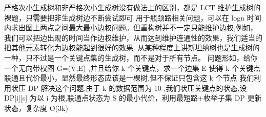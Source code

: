 {}\markdownRendererSectionBegin
{}\markdownRendererInterblockSeparator
{}严格次小生成树和非严格次小生成树没有做法上的区别，都是\markdownRendererDollarSign{} LCT\markdownRendererSoftLineBreak
{}\markdownRendererDollarSign{}维护生成树的裸题，只需要把非生成树边不断尝试即可\markdownRendererInterblockSeparator
{}
\markdownRendererSectionEnd 
\markdownRendererSectionEnd \markdownRendererSectionBegin
{}\markdownRendererInterblockSeparator
{}用于瓶颈路相关问题，可以在\markdownRendererDollarSign{} logn \markdownRendererDollarSign{}时间内求出图上两点之间最大最小边权问题。但重构树并不一定只能维护边权,例如，我们可以把边出现的时间当作边权维护，从而达到维护连通性的效果，我们适当的把其他元素转化为边权能起到很好的效果.\markdownRendererInterblockSeparator
{}\markdownRendererInterblockSeparator
{}
\markdownRendererSectionEnd \markdownRendererSectionBegin
{}\markdownRendererInterblockSeparator
{}从某种程度上讲斯坦纳树也是生成树的一种，只不过是一个关键点集的生成树，而不是对于所有节点。\markdownRendererParagraphSeparator
{}问题形如，给你一个无向带权图\markdownRendererDollarSign{} G=(V,E) \markdownRendererDollarSign{},并且给你\markdownRendererDollarSign{} k\markdownRendererSoftLineBreak
{}\markdownRendererDollarSign{}个关键点，求一个边集\markdownRendererDollarSign{} E \markdownRendererDollarSign{}使得\markdownRendererDollarSign{} k \markdownRendererDollarSign{}个关键点联通且代价最小，显然最终形态应该是一棵树,但不保证只包含这\markdownRendererDollarSign{} k \markdownRendererDollarSign{}个节点\markdownRendererParagraphSeparator
{}我们利用状压\markdownRendererDollarSign{} DP \markdownRendererDollarSign{}解决这个问题,由于\markdownRendererDollarSign{} k\markdownRendererSoftLineBreak
{}\markdownRendererDollarSign{}的数据范围为\markdownRendererDollarSign{} 10 \markdownRendererDollarSign{},我们状压关键点的状态,设\markdownRendererDollarSign{} DP[i][s] \markdownRendererDollarSign{}为以\markdownRendererDollarSign{} i\markdownRendererParagraphSeparator
{} \markdownRendererDollarSign{}为根,联通点状态为\markdownRendererDollarSign{} S\markdownRendererSoftLineBreak
{}\markdownRendererDollarSign{}的最小代价，利用最短路+枚举子集\markdownRendererDollarSign{} DP \markdownRendererDollarSign{}更新状态，复杂度\markdownRendererDollarSign{} O(3\markdownRendererCircumflex{}k) \markdownRendererDollarSign{}\markdownRendererInterblockSeparator
